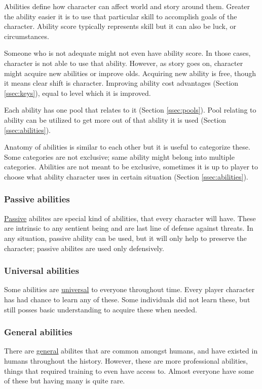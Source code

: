 Abilities define how character can affect world and story around them.
Greater the ability easier it is to use that particular skill to accomplish goals of the character.
Ability score typically represents skill but it can also be luck, or circumstances.

Someone who is not adequate might not even have ability score.
In those cases, character is not able to use that ability.
However, as story goes on, character might acquire new abilities or improve olds.
Acquiring new ability is free, though it means clear shift is character.
Improving ability cost advantages (Section \ref{ssec:keys}), equal to level which it is improved.

Each ability has one pool that relates to it (Section \ref{ssec:pools}).
Pool relating to ability can be utilized to get more out of that ability it is used (Section \ref{ssec:abilities}).

Anatomy of abilities is similar to each other but it is useful to categorize these.
Some categories are not exclusive; same ability might belong into multiple categories.
Abilities are not meant to be exclusive, sometimes it is up to player to choose what ability character uses in certain situation (Section \ref{ssec:abilities}).

\subsubsection{Passive abilities}\label{sssec:passive_abilities}
\hyperref[examples_passive_abilities]{Passive} abilites are special kind of abilities, that every character will have.
These are intrinsic to any sentient being and are last line of defense against threats.
In any situation, passive ability can be used, but it will only help to preserve the character; passive abilites are used only defensively.

\subsubsection{Universal abilities}\label{sssec:universal_abilities}
Some abilities are \hyperref[examples_universal_abilities]{universal} to everyone throughout time.
Every player character has had chance to learn any of these.
Some individuals did not learn these, but still posses basic understanding to acquire these when needed.

\subsubsection{General abilities}\label{sssec:general_abilities}
There are \hyperref[examples_general_abilities]{general} abilites that are common amongst humans, and have existed in humans throughout the history.
However, these are more professional abilities, things that required training to even have access to.
Almost everyone have some of these but having many is quite rare.

